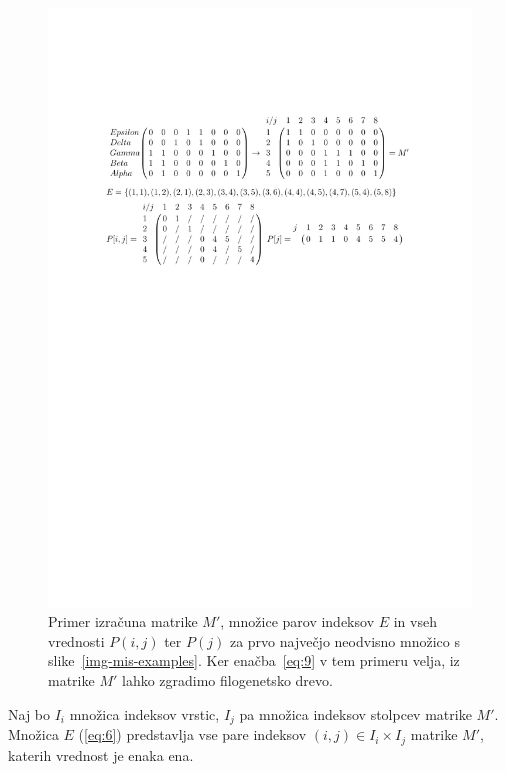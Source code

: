 \documentclass[a4paper, 12pt]{book}
\begin{document}
\begin{figure}
	\begin{center}
		\includegraphics[scale=0.8, clip=true, trim=2.9cm 17cm 3cm 5cm]{gfx/tree_reconstruction_m.pdf}
	\end{center}
	\caption{
		Primer izračuna matrike $M'$, množice parov indeksov $E$ in vseh 
		vrednosti $P(i, j)$ ter $P(j)$ za prvo največjo neodvisno množico s 
		slike~\ref{img-mis-examples}. Ker enačba~\ref{eq:9} v tem primeru 
		velja, iz matrike $M'$ lahko zgradimo filogenetsko drevo.
	}
	\label{img-reconstruct-m}
\end{figure}

Naj bo $I_i$ množica indeksov vrstic, $I_j$ pa množica indeksov stolpcev matrike 
$M'$. Množica $E$ (\ref{eq:6}) predstavlja vse pare indeksov 
$(i, j) \in I_i \times I_j$ matrike $M'$, katerih vrednost je enaka ena.
\end{document}
